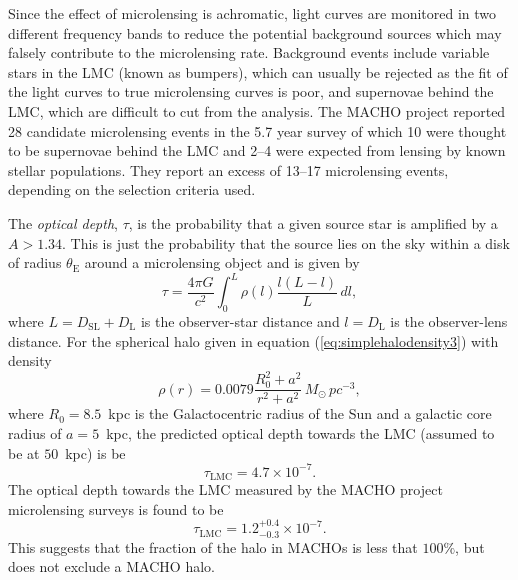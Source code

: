 Since the effect of microlensing is achromatic, light curves are monitored in
two different frequency bands to reduce the potential background sources
which may falsely contribute to the microlensing rate. Background events
include variable stars in the LMC (known as bumpers\cite{1996astro.ph..6165A}), 
which can usually be rejected as the fit of the light curves to true
microlensing curves is poor, and supernovae behind the LMC, which are difficult
to cut from the analysis. The MACHO project reported 28 candidate microlensing
events in the 5.7 year survey of which 10 were thought to be supernovae
behind the LMC and 2--4 were expected from lensing by known stellar
populations.  They report an excess of 13--17 microlensing events, depending
on the selection criteria used.

The \emph{optical depth}, $\tau$, is the probability that a given source star
is amplified by a $A > 1.34$. This is just the probability that the source
lies on the sky within a disk of radius $\theta_\mathrm{E}$ around a
microlensing object and is given by\cite{Alcock:1995zx}
\begin{equation}
\tau = \frac{4\pi G}{c^2} \int_0^{L} \rho(l) \frac{l(L - l)}{L}\,dl,
\end{equation}
where $L = D_\mathrm{SL} + D_\mathrm{L}$ is the observer-star distance and $l
= D_\mathrm{L}$ is the observer-lens distance. For the spherical halo given in
equation (\ref{eq:simplehalodensity3}) with density
\begin{equation}
\rho(r) = 0.0079 \frac{R_0^2 + a^2}{r^2 + a^2} \,M_\odot\, pc^{-3},
\end{equation}
where $R_0 = 8.5$~kpc is the Galactocentric radius of the Sun and a galactic
core radius of $a = 5$~kpc, the predicted optical depth towards the LMC
(assumed to be at $50$~kpc) is be
\begin{equation}
\tau_\mathrm{LMC} = 4.7 \times 10^{-7}.
\end{equation}
The optical depth towards the LMC measured by the MACHO project
microlensing surveys is found to be
\begin{equation}
\tau_\mathrm{LMC} = 1.2_{-0.3}^{+0.4} \times 10^{-7}.
\end{equation}
This suggests that the fraction of the halo in MACHOs is less that $100\%$,
but does not exclude a MACHO halo.

